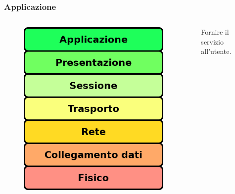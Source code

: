 \documentclass{beamer}
\begin{document}
\subsubsection*{Applicazione}
\begin{frame}{\insertsection}{\insertsubsection}
\begin{columns}
\begin{figure}
\includegraphics[width=0.95\textwidth]{imgs/01-iso-osi.drawio.png}
\end{figure}
\begin{block}{\insertsubsubsection}
Fornire il servizio all'utente.
\end{block}
\end{columns}
\end{frame}
\end{document}
